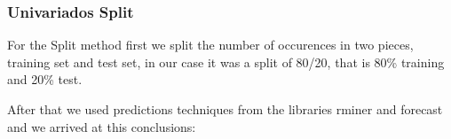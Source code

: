 \subsubsection{Univariados Split}


\quad For the Split method first we split the number of occurences in two pieces, training set and test set, in our case it was a split of 80/20, that is 80\% training and 20\% test.

After that we used predictions techniques from the libraries rminer and forecast and we arrived at this conclusions: